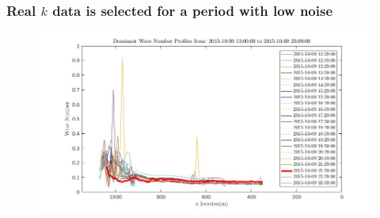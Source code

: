 \documentclass[7pt]{beamer}
\begin{document}
\begin{frame}
	\frametitle{Real $k$ data is selected for a period with low noise}
		\begin{figure}
			\includegraphics[width=1.0\linewidth]{img/Real_k_data.jpg}
		\end{figure}
\end{frame}
\end{document}
